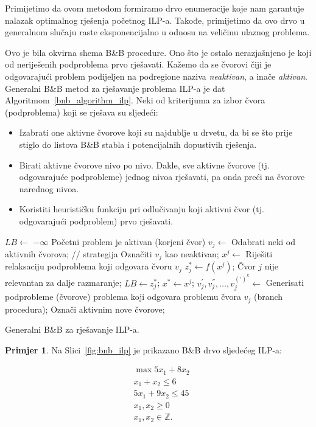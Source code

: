 \documentclass[b5paper, utf8, 11pt, colorlinks]{book}
\theoremstyle{definition}
\newtheorem{primjer}{Primjer}[chapter]
\begin{document}
Primijetimo da ovom metodom formiramo drvo enumeracije koje nam garantuje nalazak optimalnog rješenja početnog ILP-a. Takođe, primijetimo da ovo drvo u generalnom slučaju raste eksponencijalno u odnosu na veličinu ulaznog problema.  

  Ovo je bila okvirna shema B\&B procedure. Ono što je ostalo nerazjašnjeno je koji od neriješenih podproblema prvo rješavati. Kažemo da se čvorovi čiji je odgovarajući problem podijeljen na podregione naziva \emph{neaktivan}, a inače \emph{aktivan}. Generalni B\&B metod za rješavanje problema ILP-a je dat   Algoritmom~\ref{bnb_algorithm_ilp}.  Neki od kriterijuma za izbor čvora (podproblema) koji se rješava su sljedeći:
  \begin{itemize}
  	\item Izabrati one aktivne čvorove koji su najdublje u drvetu, da bi se što prije stiglo do listova B\&B stabla i potencijalnih dopustivih rješenja.
  	\item Birati aktivne čvorove nivo po nivo. Dakle, sve aktivne čvorove (tj. odgovarajuće podprobleme) jednog nivoa   rješavati, pa onda preći na čvorove narednog nivoa. 
  	\item Koristiti heurističku funkciju pri odlučivanju koji aktivni čvor (tj. odgovarajući podproblem) prvo rješavati. 
  \end{itemize}

\begin{algorithm}[!htb] 
	\begin{algorithmic}[1] 
		\STATE $LB \gets$ $-\infty$
		\STATE Početni problem je aktivan (korjeni čvor)
		\STATE  $v_j \gets$ Odabrati neki od aktivnih čvorova; // strategija
		\STATE  Označiti $v_j$ kao neaktivan;
		\STATE  $x^j \gets$ Riješiti relaksaciju podproblema koji odgovara čvoru $v_j$
		\STATE $z^*_j \gets f(x^j)$;
		\STATE Čvor $j$ nije relevantan za dalje razmaranje; 
		\ENDIF
		\STATE $LB \gets z^*_j$;
		\STATE $x^* \gets x^j$;
		\ELSE 
		\STATE $v_j^{'}, v_j^{''},\ldots, v_j^{(')^k}  \gets$ Generisati podprobleme (čvorove) problema koji odgovara problemu čvora $v_j$ (branch procedura);
		\STATE Označi aktivnim nove čvorove; 
		\ENDIF
		\ENDIF
		\ENDWHILE
	\end{algorithmic}
	\caption{Generalni B\&B za rješavanje ILP-a.}\label{bnb_algorithm_ilp}
\end{algorithm}
\begin{primjer}
Na Slici~\ref{fig:bnb_ilp} je prikazano B\&B drvo sljedećeg ILP-a:
\end{primjer}
\begin{align*}
    &\max 5 x_1 + 8 x_2 \\
    &x_1 + x_2 \leq 6 \\
    & 5 x_1 + 9 x_2 \leq 45 \\
    & x_1, x_2 \geq 0\\
    & x_1,x_2 \in \mathbb{Z}.
\end{align*}
\end{document}
